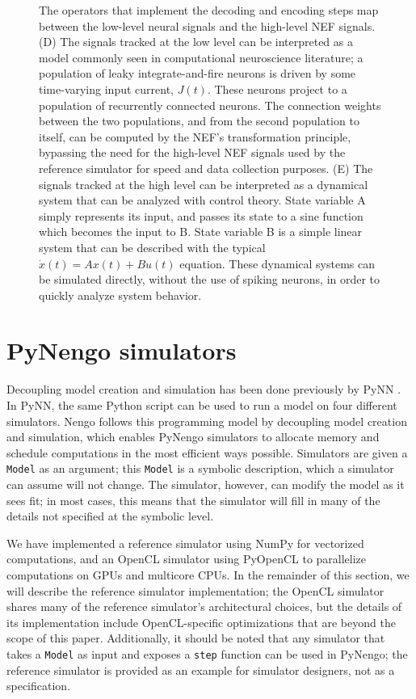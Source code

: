 \documentclass{frontiersSCNS}
\begin{document}
\begin{figure}
{   The operators that implement the decoding
   and encoding steps map between
   the low-level neural signals
   and the high-level NEF signals.
   (D) The signals tracked at the low level
   can be interpreted as a model
   commonly seen in computational neuroscience literature;
   a population of leaky integrate-and-fire neurons
   is driven by some time-varying input current, $J(t)$.
   These neurons project to a population
   of recurrently connected neurons.
   The connection weights between the two populations,
   and from the second population to itself,
   can be computed by the NEF's transformation
   principle, bypassing the need for
   the high-level NEF signals
   used by the reference simulator
   for speed and data collection purposes.
   (E) The signals tracked at the high level
   can be interpreted as a dynamical system
   that can be analyzed with control theory.
   State variable A simply represents its input,
   and passes its state to a sine function
   which becomes the input to B.
   State variable B is a simple linear system
   that can be described with the typical
   $\dot{x}(t) = A x(t) + B u(t)$ equation.
   These dynamical systems can be simulated
   directly, without the use of spiking neurons,
   in order to quickly analyze system behavior.}
\end{figure}

\section{PyNengo simulators} \label{sec:simulators}

Decoupling model creation and simulation
has been done previously
by PyNN \citep{davison2008}.
In PyNN, the same Python script
can be used to run a model
on four different simulators.
Nengo follows this programming model by
decoupling model creation and simulation,
which enables PyNengo simulators
to allocate memory and schedule computations
in the most efficient ways possible.
Simulators are given a \texttt{Model}
as an argument;
this \texttt{Model} is a symbolic description,
which a simulator can assume will not change.
The simulator, however,
can modify the model as it sees fit;
in most cases, this means that the simulator
will fill in many of the details
not specified at the symbolic level.

We have implemented
a reference simulator using NumPy
for vectorized computations,
and an OpenCL simulator
using PyOpenCL to parallelize
computations on GPUs and multicore CPUs.
In the remainder of this section,
we will describe
the reference simulator implementation;
the OpenCL simulator shares many
of the reference simulator's architectural choices,
but the details of its implementation
include OpenCL-specific optimizations
that are beyond the scope of this paper.
Additionally, it should be noted that
any simulator that takes a \texttt{Model}
as input and exposes a \texttt{step}
function can be used in PyNengo;
the reference simulator
is provided as an example
for simulator designers,
not as a specification.
\end{document}
